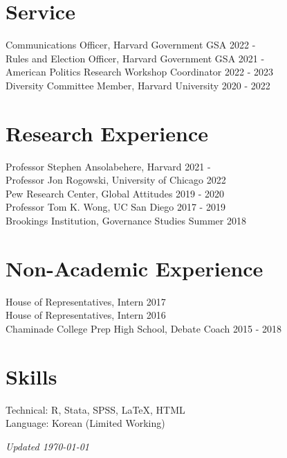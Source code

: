 \documentclass[margin, line]{res}
\begin{document}
\begin{resume}
\section{Service}
Communications Officer, Harvard Government GSA \hfill 2022 - \\
Rules and Election Officer, Harvard Government GSA \hfill 2021 -\\
American Politics Research Workshop Coordinator \hfill 2022 - 2023\\
Diversity Committee Member, Harvard University \hfill 2020 - 2022

\section{Research Experience}
Professor Stephen Ansolabehere, Harvard \hfill 2021 - \\
Professor Jon Rogowski, University of Chicago \hfill 2022\\
Pew Research Center, Global Attitudes \hfill 2019 - 2020\\
Professor Tom K. Wong, UC San Diego \hfill 2017 - 2019\\
Brookings Institution, Governance Studies \hfill Summer 2018

\section{Non-Academic Experience}
House of Representatives, Intern \hfill 2017\\
House of Representatives, Intern \hfill 2016\\
Chaminade College Prep High School, Debate Coach \hfill 2015 - 2018

\section{Skills}
Technical: R, Stata, SPSS, \LaTeX, HTML\\
Language: Korean (Limited Working)

\vspace*{\fill}

\hfill \small{\textit{Updated \today}}

\end{resume}
\end{document}
